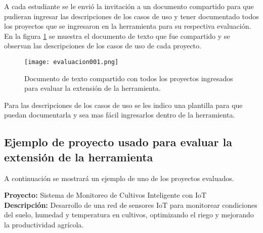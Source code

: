 A cada estudiante se le envió la invitación a un documento compartido para que pudieran ingresar las descripciones de los casos de uso y tener documentado todos los proyectos que se ingresaron en la herramienta para su respectiva evaluación. En la figura \ref{fig:cap3_evaluacion_001} se muestra el documento de texto que fue compartido y se observan las descripciones de los casos de uso de cada proyecto.

 \begin{figure}[H]  
	\centering
	\texttt{[image: evaluacion001.png]} 
	\caption{Documento de texto compartido con todos los proyectos ingresados para evaluar la extensión de la herramienta.}
	\label{fig:cap3_evaluacion_001}
\end{figure}

Para las descripciones de los casos de uso se les indico una plantilla para que puedan documentarla y sea mas fácil ingresarlos dentro de la herramienta. 

\subsection{Ejemplo de proyecto usado para evaluar la extensión de la herramienta}

A continuación se mostrará un ejemplo de uno de los proyectos evaluados.

\textbf{Proyecto: } Sistema de Monitoreo de Cultivos Inteligente con IoT \\
\textbf{Descripción: } Desarrollo de una red de sensores IoT para monitorear condiciones del suelo, humedad y temperatura en cultivos, optimizando el riego y mejorando la productividad agrícola. 

